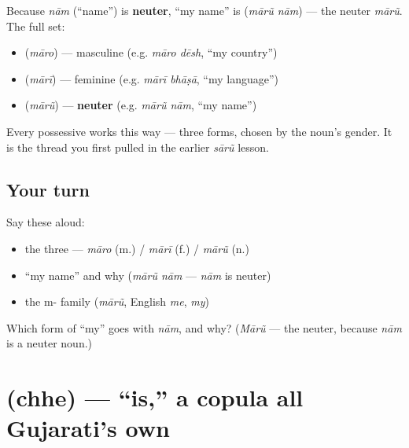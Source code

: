 \begin{grammarlens}[title={Grammar Lens: \textquotedblleft{}my\textquotedblright{} agrees in all three genders}]
Because \emph{nām} (\textquotedblleft{}name\textquotedblright{}) is \textbf{neuter}, \textquotedblleft{}my name\textquotedblright{} is \textbf{ } (\emph{mārũ nām}) — the neuter \emph{mārũ}. The full set:

\begin{itemize}
\raggedright
  \item \textbf{} (\emph{māro}) — masculine (e.g. \emph{māro dēsh}, \textquotedblleft{}my country\textquotedblright{})
  \item \textbf{} (\emph{mārī}) — feminine (e.g. \emph{mārī bhāṣā}, \textquotedblleft{}my language\textquotedblright{})
  \item \textbf{} (\emph{mārũ}) — \textbf{neuter} (e.g. \emph{mārũ nām}, \textquotedblleft{}my name\textquotedblright{})
\end{itemize}

Every possessive works this way — three forms, chosen by the noun's gender. It is the thread you first pulled in the earlier \emph{sārũ} lesson.
\end{grammarlens}

\subsection*{Your turn}
Say these aloud:

\begin{itemize}
\raggedright
  \item the three — \emph{māro} (m.) / \emph{mārī} (f.) / \emph{mārũ} (n.)
  \item \textquotedblleft{}my name\textquotedblright{} and why (\emph{mārũ nām} — \emph{nām} is neuter)
  \item the m- family (\emph{mārũ}, English \emph{me}, \emph{my})
\end{itemize}

\begin{tcolorbox}[breakable,colback=teal!4,colframe=teal!35!black,title={Before you move on}]
Which form of \textquotedblleft{}my\textquotedblright{} goes with \emph{nām}, and why? (\emph{Mārũ} — the neuter, because \emph{nām} is a neuter noun.)
\end{tcolorbox}
\section[\texorpdfstring{\gu{છે} (chhe)}{છે (chhe)}]{ (chhe) — \textquotedblleft{}is,\textquotedblright{} a copula all Gujarati's own}


